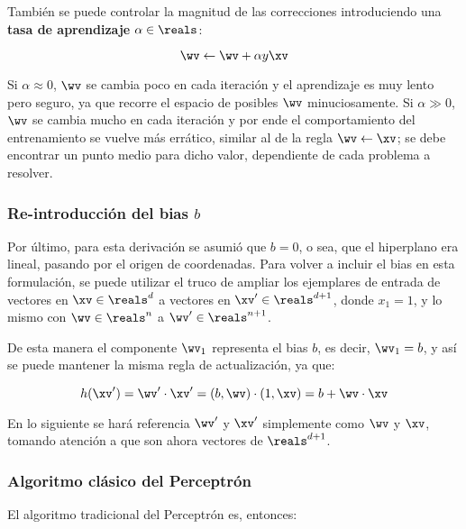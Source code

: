 También se puede controlar la magnitud de las correcciones introduciendo una \textbf{tasa de aprendizaje} $\alpha \in \reals$:

\begin{equation}
\wv \leftarrow \wv +  \alpha y \xv
\end{equation}

Si $\alpha \approx 0$, $\wv$ se cambia poco en cada iteración y el aprendizaje es muy lento pero seguro, ya que recorre el espacio de posibles $\wv$ minuciosamente. Si $\alpha \gg 0$, $\wv$ se cambia mucho en cada iteración y por ende el comportamiento del entrenamiento se vuelve más errático, similar al de la regla $\wv \leftarrow \xv$; se debe encontrar un punto medio para dicho valor, dependiente de cada problema a resolver.

\subsubsection{Re-introducción del bias $b$}

Por último, para esta derivación se asumió que $b=0$, o sea, que el hiperplano era lineal, pasando por el origen de coordenadas. Para volver a incluir el bias en esta formulación, se puede utilizar el truco de ampliar los ejemplares de entrada de vectores en $\xv \in \reals^d$ a vectores en $\xv' \in \reals^{d+1}$, donde $x_1=1$, y lo mismo con $\wv \in \reals^n$ a  $\wv' \in \reals^{n+1}$. 


De esta manera el componente $\wv_1$ representa el bias $b$, es decir, $\wv_1=b$, y así se puede mantener la misma regla de actualización, ya que:

\begin{equation}
 h(\xv')= \wv' \cdot \xv' = (b,\wv) \cdot (1,\xv) = b + \wv \cdot \xv
 \end{equation}

En lo siguiente se hará referencia $\wv'$ y $\xv'$ simplemente como $\wv$ y $\xv$, tomando atención a que son ahora vectores de $\reals^{d+1}$.

\subsubsection{Algoritmo clásico del Perceptrón}
El algoritmo tradicional del Perceptrón es, entonces:

